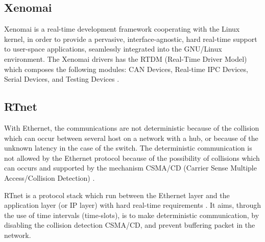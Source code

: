 \documentclass[conference]{IEEEtran}
\begin{document}
%
\subsection{Xenomai}\label{subsec:xenomai}

Xenomai \cite{xenomai_api} is a real-time development framework cooperating with the Linux kernel, in order to provide a pervasive, interface-agnostic, hard real-time support to user-space applications, seamlessly integrated into the GNU/Linux environment. The Xenomai drivers has the RTDM (Real-Time Driver Model) which composes the following modules: CAN Devices, Real-time IPC Devices, Serial Devices, and Testing Devices \cite{rtdm_Kiszka}.
%
\subsection{RTnet}\label{subsec:rtnet}

With Ethernet, the communications are not deterministic because of the collision which can occur between several host on a network with a hub, or because of the unknown latency in the case of the switch. The deterministic communication is not allowed by the Ethernet protocol because of the possibility of collisions which can occurs and supported by the mechanism CSMA/CD (Carrier Sense Multiple Access/Collision Detection) \cite{rtnet_IEEE_so53551}.

RTnet is a protocol stack which run between the Ethernet layer and the application layer (or IP layer) with hard real-time requirements \cite{rtnet_org}. It aims, through the use of time intervals (time-slots), is to make deterministic communication, by disabling the collision detection CSMA/CD, and prevent buffering packet in the network. 




\end{document}

